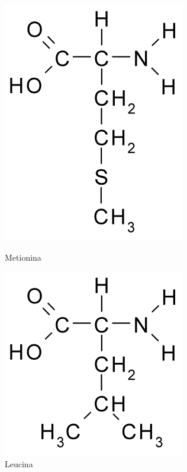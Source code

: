 \documentclass[a4paper,12pt]{article}
\begin{document}
 	\begin{figure}[H]
 		\begin{center}
 			\begin{minipage}{0.3\linewidth}
 				\centering   
 				\includegraphics[width=0.63\linewidth]{methionine.png}	
 				\caption{Metionina}
 				\label{fig:methionine}
 			\end{minipage}
 			\begin{minipage}{0.3\linewidth}
 				\centering   
 				\includegraphics[width=0.8\linewidth]{leucine.png}
 				\caption{Leucina}

\end{minipage}
\end{center}
\end{figure}
\end{document}
